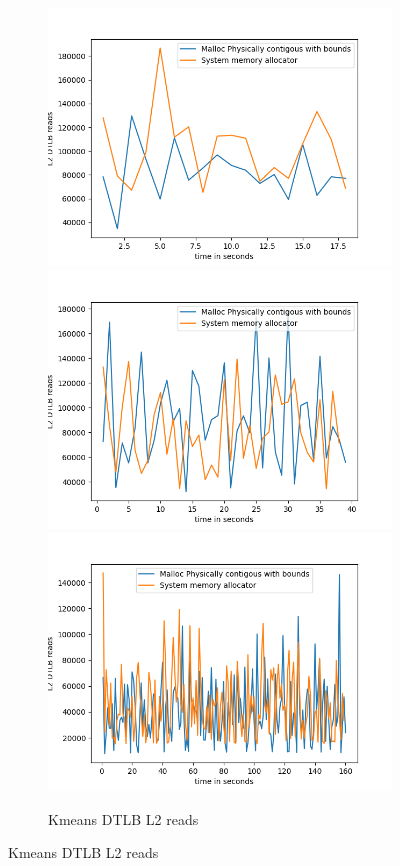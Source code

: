 \begin{figure}
  \begin{subfigure}{\linewidth}
  \includegraphics[width=.5\linewidth]{BenchmarkRuns/Kmeans/l2_tlb_kmeans_3_dimentions.png}\hfill
  \includegraphics[width=.5\linewidth]{BenchmarkRuns/Kmeans/l2_tlb_6_dimentions.png}\hfill
  \includegraphics[width=.5\linewidth]{BenchmarkRuns/Kmeans/l2_tlb_40_dimentions.png}
  \caption{Kmeans DTLB L2 reads}
\end{subfigure}
\end{figure}

